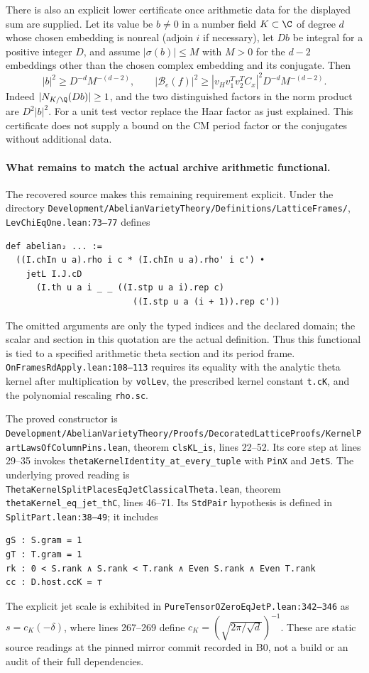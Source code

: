 There is also an explicit lower certificate once arithmetic data
for the displayed sum are supplied.  Let its value be $b\ne0$
in a number field $K\subset\C$ of degree $d$ whose chosen
embedding is nonreal (adjoin $i$ if necessary), let $Db$ be integral
for a positive integer $D$, and assume
$|\sigma(b)|\leq M$ with $M>0$ for the $d-2$ embeddings other than the
chosen complex embedding and its conjugate.  Then
\[
 |b|^2\geq D^{-d}M^{-(d-2)},\qquad
 |\mathcal B_e(f)|^2\geq
 |v_Hv_1^Tv_2^TC_x|^2D^{-d}M^{-(d-2)}.
 \tag{B19k}
\]
Indeed $|N_{K/\Q}(Db)|\geq1$, and the two distinguished
factors in the norm product are $D^2|b|^2$.
For a unit test vector replace the Haar factor as just explained.
This certificate does not supply a bound on the CM period factor
or the conjugates without additional data.

\paragraph{What remains to match the actual archive arithmetic functional.}
The recovered source makes this remaining requirement explicit.
Under the directory
\texttt{Development/AbelianVarietyTheory/Definitions/LatticeFrames/},
\texttt{LevChiEqOne.lean:73--77} defines
\begin{verbatim}
def abelian₂ ... :=
  ((I.chIn u a).rho i c * (I.chIn u a).rho' i c') •
    jetL I.J.cD
      (I.th u a i _ _ ((I.stp u a i).rep c)
                         ((I.stp u a (i + 1)).rep c'))
\end{verbatim}
The omitted arguments are only the typed indices and the declared
domain; the scalar and section in this quotation are the actual
definition.  Thus this functional is tied to a specified
arithmetic theta section and its period frame.
\texttt{OnFramesRdApply.lean:108--113} requires its equality
with the analytic theta kernel after multiplication by
\texttt{volLev}, the prescribed kernel constant \texttt{t.cK},
and the polynomial rescaling \texttt{rho.sc}.

The proved constructor is
\texttt{Development/AbelianVarietyTheory/Proofs/DecoratedLatticeProofs/KernelPartLawsOfColumnPins.lean},
theorem \texttt{clsKL\_is}, lines 22--52.  Its core step at
lines 29--35 invokes
\texttt{thetaKernelIdentity\_at\_every\_tuple} with
\texttt{PinX} and \texttt{JetS}.
The underlying proved reading is
\texttt{ThetaKernelSplitPlacesEqJetClassicalTheta.lean},
theorem \texttt{thetaKernel\_eq\_jet\_thC}, lines 46--71.
Its \texttt{StdPair} hypothesis is defined in
\texttt{SplitPart.lean:38--49}; it includes
\begin{verbatim}
gS : S.gram = 1
gT : T.gram = 1
rk : 0 < S.rank ∧ S.rank < T.rank ∧ Even S.rank ∧ Even T.rank
cc : D.host.ccK = ⊤
\end{verbatim}
The explicit jet scale is exhibited in
\texttt{PureTensorOZeroEqJetP.lean:342--346} as
$s=c_K(-\delta)$, where lines 267--269 define
$c_K=(\sqrt{2\pi/\sqrt d})^{-1}$.
These are static source readings at the pinned mirror commit
recorded in B0, not a build or an audit of their full dependencies.

